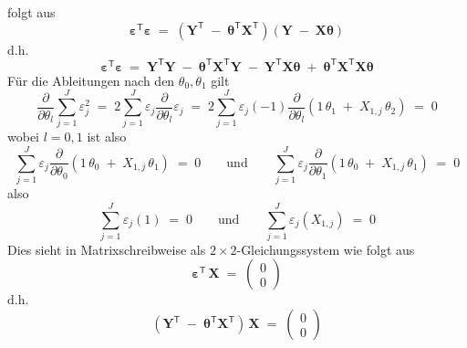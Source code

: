 folgt aus
\begin{equation}
\boldsymbol{\varepsilon}^\mathsf{T}  \boldsymbol{\varepsilon} \; = \;
\left(
\mathbf{Y}^\mathsf{T}
\; - \; 
\boldsymbol{\theta}^\mathsf{T} \mathbf{X}^\mathsf{T} \right)
\left(
\mathbf{Y}
\; - \; 
\mathbf{X} \boldsymbol{\theta} \right)
\end{equation}
d.h.
\begin{equation}
\boldsymbol{\varepsilon}^\mathsf{T}  \boldsymbol{\varepsilon} \; = \;
\mathbf{Y}^\mathsf{T} \mathbf{Y}
\; - \; 
\boldsymbol{\theta}^\mathsf{T} \mathbf{X}^\mathsf{T}  \mathbf{Y} 
\; - \; 
\mathbf{Y}^\mathsf{T}  \mathbf{X} \boldsymbol{\theta}
\; + \; 
\boldsymbol{\theta}^\mathsf{T} \mathbf{X}^\mathsf{T} \mathbf{X} \boldsymbol{\theta}
\end{equation}
Für die Ableitungen nach den $\theta_0, \theta_1$ gilt
\begin{equation}
\frac{\partial}{\partial \theta_l} \sum_{j=1}^J \varepsilon_j^2 \; = \; 
2 \sum_{j=1}^J \varepsilon_j \frac{\partial}{\partial \theta_l} \varepsilon_j \; = \; 
2 \sum_{j=1}^J \varepsilon_j (-1) \frac{\partial}{\partial \theta_l}(1 \, \theta_1 \; + \;  X_{1,j} \, \theta_2) \; = \; 0
\end{equation}
wobei $l = 0,1$ ist also
\begin{equation}
\sum_{j=1}^J \varepsilon_j  \frac{\partial}{\partial \theta_0}(1 \, \theta_0 \; + \;  X_{1,j} \, \theta_1)  \; = \; 0 \qquad \mathrm{und} \qquad 
\sum_{j=1}^J \varepsilon_j  \frac{\partial}{\partial \theta_1}(1 \, \theta_0 \; + \;  X_{1,j} \, \theta_1)  \; = \; 0
\end{equation}
also
\begin{equation}
\sum_{j=1}^J \varepsilon_j (1) \; = \; 0 \qquad \mathrm{und}  \qquad 
\sum_{j=1}^J \varepsilon_j ( X_{1,j})  \; = \; 0
\end{equation}
Dies sieht in Matrixschreibweise als $2 \times 2$-Gleichungssystem wie folgt aus
\begin{equation}
\boldsymbol{\varepsilon}^\mathsf{T} \, \mathbf{X} \; = \;
\left(
\begin{array}{c}
0\\
0
\end{array}
\right)
\end{equation}
d.h.
\begin{equation}
\left(\mathbf{Y}^\mathsf{T}
\; - \; 
\boldsymbol{\theta}^\mathsf{T} \mathbf{X}^\mathsf{T} \right) \, \mathbf{X} \; = \;
\left(
\begin{array}{c}
0\\
0
\end{array}
\right)
\end{equation}
